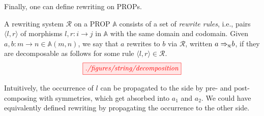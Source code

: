 
Finally, one can define rewriting on PROPs.
\begin{definition}\label{def:rewriting_prop}
 A rewriting system $\mathcal{R}$ on a PROP $\mathbb{A}$ consists of a set of \emph{rewrite rules}, i.e., pairs $\langle l, r \rangle$ of morphisms $l,r : i \to j$ in $\mathbb{A}$ with the same domain and codomain.
 Given $a,b : m \to n \in \mathbb{A}(m,n)$, we say that $a$ rewrites to $b$ via $\mathcal{R}$, written $a \Rightarrow{}_{\mkern-8mu\scriptscriptstyle{\mathcal{R}}} b$, if they are decomposable as follows for some rule $\langle l,r \rangle \in \mathcal{R}$.
 \[
\tikzfig{./figures/string/decomposition} 
 \] 
\end{definition}

Intuitively, the occurrence of $l$ can be propagated to the side by pre- and post-composing with symmetries, which get absorbed into $a_1$ and $a_2$.
We could have equivalently defined rewriting by propagating the occurrence to the other side.

